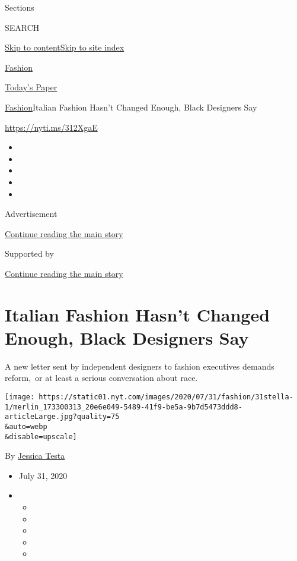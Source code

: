 Sections

SEARCH

\protect\hyperlink{site-content}{Skip to
content}\protect\hyperlink{site-index}{Skip to site index}

\href{https://www.nytimes.com/section/fashion}{Fashion}

\href{https://myaccount.nytimes.com/auth/login?response_type=cookie\&client_id=vi}{}

\href{https://www.nytimes.com/section/todayspaper}{Today's Paper}

\href{/section/fashion}{Fashion}\textbar{}Italian Fashion Hasn't Changed
Enough, Black Designers Say

\url{https://nyti.ms/312XgaE}

\begin{itemize}
\item
\item
\item
\item
\item
\end{itemize}

Advertisement

\protect\hyperlink{after-top}{Continue reading the main story}

Supported by

\protect\hyperlink{after-sponsor}{Continue reading the main story}

\hypertarget{italian-fashion-hasnt-changed-enough-black-designers-say}{%
\section{Italian Fashion Hasn't Changed Enough, Black Designers
Say}\label{italian-fashion-hasnt-changed-enough-black-designers-say}}

A new letter sent by independent designers to fashion executives demands
reform,~or at least a serious conversation about race.

\texttt{[image: https://static01.nyt.com/images/2020/07/31/fashion/31stella-1/merlin\_173300313\_20e6e049-5489-41f9-be5a-9b7d5473ddd8-articleLarge.jpg?quality=75\\\&auto=webp\\\&disable=upscale]}

By \href{https://www.nytimes.com/by/jessica-testa}{Jessica Testa}

\begin{itemize}
\item
  July 31, 2020
\item
  \begin{itemize}
  \item
  \item
  \item
  \item
  \item
  \end{itemize}
\end{itemize}

